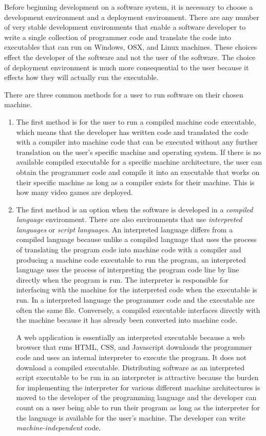 Before beginning development on a software system, it is necessary to choose a development environment and a deployment environment. There are any number of very stable development environments that enable a software developer to write a single collection of programmer code and translate the code into executables that can run on Windows, OSX, and Linux machines. These choices effect the developer of the software and not the user of the software. The choice of deployment environment is much more consequential to the user because it effects how they will actually run the executable.

There are three common methods for a user to run software on their chosen machine.

\begin{enumerate}
\item The first method is for the user to run a compiled machine code executable, which means that the developer has written code and translated the code with a compiler into machine code that can be executed without any further translation on the user's specific machine and operating system. If there is no available compiled executable for a specific machine architecture, the user can obtain the programmer code and compile it into an executable that works on their specific machine as long as a compiler exists for their machine. This is how many video games are deployed.

\item The first method is an option when the software is developed in a \emph{compiled language} environment. There are also environments that use \emph{interpreted languages} or \emph{script languages}. An interpreted language differs from a compiled language because unlike a compiled language that uses the process of translating the program code into machine code with a compiler and producing a machine code executable to run the program, an interpreted language uses the process of interpreting the program code line by line directly when the program is run. The interpreter is responsible for interfacing with the machine for the interpreted code when the executable is run. In a interpreted language the programmer code and the executable are often the same file. Conversely, a compiled executable interfaces directly with the machine because it has already been converted into machine code. 

A web application is essentially an interpreted executable because a web browser that runs HTML, CSS, and Javascript downloads the programmer code and uses an internal interpreter to execute the program. It does not download a compiled executable. Distributing software as an interpreted script executable to be run in an interpreter is attractive because the burden for implementing the interpreter for various different machine architectures is moved to the developer of the programming language and the developer can count on a user being able to run their program as long as the interpreter for the language is available for the user's machine. The developer can write \emph{machine-independent} code.


\end{enumerate}
